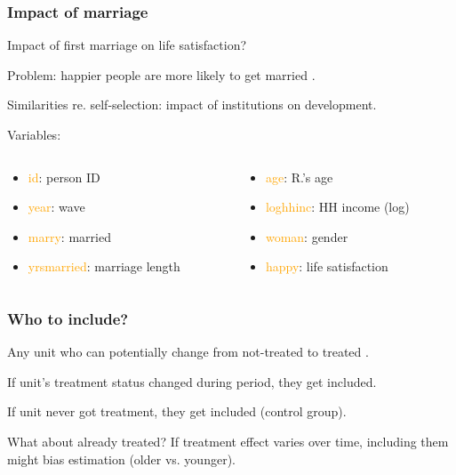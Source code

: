\documentclass[10pt,english,dvipsnames,aspectratio=169,handout]{beamer}\usepackage[]{graphicx}\usepackage[]{xcolor}
\begin{document}
\begin{frame}
  \frametitle{Impact of marriage}
  Impact of first marriage on life satisfaction?\bigskip
  
  Problem: happier people are more likely to get married \cite{frey_happiness_2005}.\bigskip
  \pause
  
  Similarities re. self-selection: impact of institutions on development.\bigskip
  \pause
  
  Variables:
  
  \begin{columns}
  \scriptsize
  	\begin{column}{0.48\textwidth}
		\begin{itemize}
		  \item \textcolor{orange}{id}: person ID
		  \item \textcolor{orange}{year}: wave
		  \item \textcolor{orange}{marry}: married
		  \item \textcolor{orange}{yrsmarried}: marriage length
		\end{itemize}
	  \end{column}
	\begin{column}{0.48\textwidth}
	  \begin{itemize}
	    \item \textcolor{orange}{age}: R.'s age
		  \item \textcolor{orange}{loghhinc}: HH income (log)
		  \item \textcolor{orange}{woman}: gender 
		  \item \textcolor{orange}{happy}: life satisfaction
	  \end{itemize}
	\end{column}
\end{columns}
  
\end{frame}


\begin{frame}
  \frametitle{Who to include?}
  Any unit who can potentially change from not-treated to treated \cite{bruderl_fixed_2015, sobel_does_2012}.\bigskip
  \pause
  
  If unit's treatment status changed during period, they get included.
  
  If unit never got treatment, they get included (control group).\bigskip
  \pause
  
  What about already treated? If treatment effect varies over time, including them might bias estimation (older vs. younger).
\end{frame}
\end{document}
